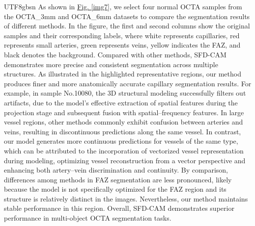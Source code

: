 \documentclass[times, review, 10pt]{elsarticle}
\begin{document}
\begin{CJK}{UTF8}{gbsn}
As shown in \hyperref[img7]{Fig. \ref*{img7}}, we select four normal OCTA samples from the OCTA\_3mm and OCTA\_6mm datasets to compare the segmentation results of different methods. In the figure, the first and second columns show the original samples and their corresponding labels, where white represents capillaries, red represents small arteries, green represents veins, yellow indicates the FAZ, and black denotes the background. Compared with other methods, SFD-CAM demonstrates more precise and consistent segmentation across multiple structures. As illustrated in the highlighted representative regions, our method produces finer and more anatomically accurate capillary segmentation results. For example, in sample No.10080, the 3D structural modeling successfully filters out artifacts, due to the model’s effective extraction of spatial features during the projection stage and subsequent fusion with spatial–frequency features. In large vessel regions, other methods commonly exhibit confusion between arteries and veins, resulting in discontinuous predictions along the same vessel. In contrast, our model generates more continuous predictions for vessels of the same type, which can be attributed to the incorporation of vectorized vessel representation during modeling, optimizing vessel reconstruction from a vector perspective and enhancing both artery–vein discrimination and continuity. By comparison, differences among methods in FAZ segmentation are less pronounced, likely because the model is not specifically optimized for the FAZ region and its structure is relatively distinct in the images. Nevertheless, our method maintains stable performance in this region. Overall, SFD-CAM demonstrates superior performance in multi-object OCTA segmentation tasks.
\par


\end{CJK}
\end{document}
